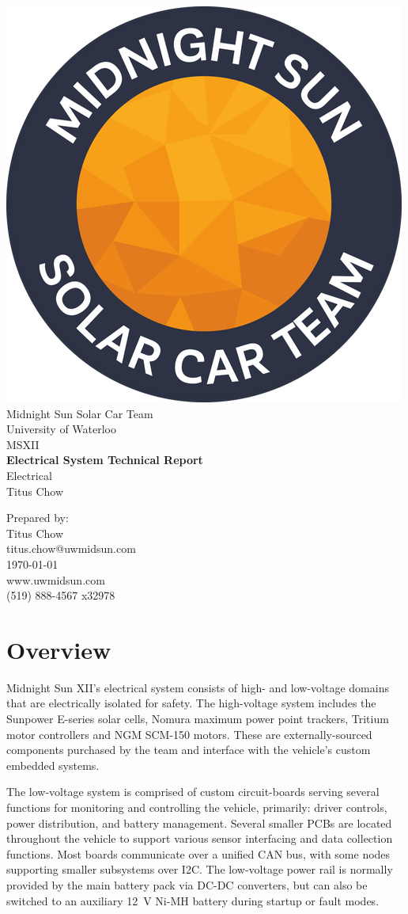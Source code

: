 \documentclass[10pt]{article}
\makeatletter
\newcommand\theteamname{Midnight Sun Solar Car Team} %
\newcommand\theuniversityname{University of Waterloo} %
\newcommand\theteamwebsite{www.uwmidsun.com} %
\newcommand\theteamphone{(519) 888-4567 x32978} %
\newcommand\thetitle{Electrical System Technical Report} %
\newcommand\thesubtitle{Electrical} %
\newcommand\theauthor{Titus Chow} %
\newcommand\theauthorcontact{titus.chow@uwmidsun.com} %
\newcommand\thedate{\today} %
\makeatother
\begin{document}
\begin{titlepage}
\large
\vspace*{2cm}
\centering
\includegraphics[width=.25\textwidth]{./figures/midnightSunLogoCircle.png} \\
\vspace{1.5cm}
{\LARGE \theteamname} \\
\theuniversityname \\
\vspace{2.2cm}
{\LARGE MSXII} \\
\vspace{0.4cm}
{\huge\bfseries \thetitle} \\
\vspace{0.2cm}
{\LARGE \thesubtitle} \\
\vspace{2.2cm}
\ifdefined \theauthor
\par Prepared by: \\
\theauthor \\
\theauthorcontact \\
\fi
\thedate \\
\vfill
\theteamwebsite \\
\theteamphone
\end{titlepage}

\tableofcontents
\listoffigures %

\section{Overview}

Midnight Sun XII's electrical system consists of high- and low-voltage domains that are electrically isolated for safety. The high-voltage system includes the Sunpower E-series solar cells, Nomura maximum power point trackers, Tritium motor controllers and NGM SCM-150 motors. These are externally-sourced components purchased by the team and interface with the vehicle's custom embedded systems.

The low-voltage system is comprised of custom circuit-boards serving several functions for monitoring and controlling the vehicle, primarily: driver controls, power distribution, and battery management. Several smaller PCBs are located throughout the vehicle to support various sensor interfacing and data collection functions. Most boards communicate over a unified CAN bus, with some nodes supporting smaller subsystems over I2C. The low-voltage power rail is normally provided by the main battery pack via DC-DC converters, but can also be switched to an auxiliary \SI{12}{\volt} Ni-MH battery during startup or fault modes.
\end{document}
